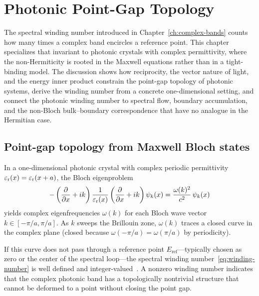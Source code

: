 \chapter{Photonic Point-Gap Topology}
\label{ch:point-gap}

\begin{chapterlead}
The spectral winding number introduced in Chapter~\ref{ch:complex-bands}
counts how many times a complex band encircles a reference point. This
chapter specializes that invariant to photonic crystals with complex
permittivity, where the non-Hermiticity is rooted in the Maxwell
equations rather than in a tight-binding model. The discussion shows how reciprocity,
the vector nature of light, and the energy inner product constrain the
point-gap topology of photonic systems, derive the winding number from
a concrete one-dimensional setting, and connect the photonic winding
number to spectral flow, boundary accumulation, and the non-Bloch
bulk--boundary correspondence that have no analogue in the Hermitian
case.
\end{chapterlead}


\section{Point-gap topology from Maxwell Bloch states}
\label{sec:point-gap-maxwell}

In a one-dimensional photonic crystal with complex periodic permittivity
$\varepsilon_{\mathrm{r}}(x) = \varepsilon_{\mathrm{r}}(x + a)$, the Bloch eigenproblem
\begin{equation}
 -\left(\frac{\partial }{\partial x} + ik\right)\frac{1}{\varepsilon_{\mathrm{r}}(x)}
 \left(\frac{\partial }{\partial x} + ik\right)\psi_k(x)
 = \frac{\omega(k)^2}{c^2}\,\psi_k(x)
 \label{eq:1d-bloch-complex}
\end{equation}
yields complex eigenfrequencies $\omega(k)$ for each Bloch wave vector
$k \in [-\pi/a, \pi/a]$. As $k$ sweeps the Brillouin zone, $\omega(k)$
traces a closed curve in the complex plane (closed because
$\omega(-\pi/a) = \omega(\pi/a)$ by periodicity).

If this curve does not pass through a reference point
$E_{\mathrm{ref}}$---typically chosen as zero or the center of the
spectral loop---the spectral winding number~\eqref{eq:winding-number}
is well defined and integer-valued~\cite{yao2018edge,yokomizo2019non,shen2017topological}. A nonzero winding number indicates
that the complex photonic band has a topologically nontrivial structure
that cannot be deformed to a point without closing the point gap.

